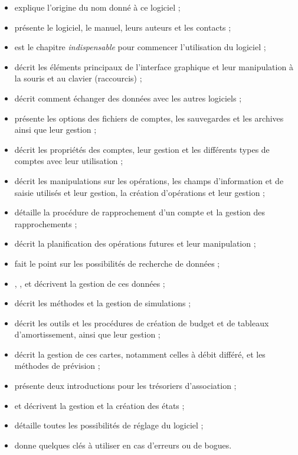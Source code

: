 \begin{itemize}
	\item {} explique l'origine du nom donné à ce logiciel ;
	\item {} présente le logiciel, le manuel, leurs auteurs et les contacts ;
	\item {} est le chapitre \emph{indispensable} pour commencer l'utilisation du logiciel ;
	\item {} décrit les éléments principaux de l'interface graphique et leur manipulation à la souris et au clavier (raccourcis) ;
	\item {} décrit comment échanger des données avec les autres logiciels ;
	\item {} présente les options des fichiers de comptes, les sauvegardes et les archives ainsi que leur gestion ;
	\item {} décrit les propriétés des comptes, leur gestion et les différents types de comptes avec leur utilisation ;
	\item {} décrit les manipulations sur les opérations, les champs d'information et de saisie utilisés et leur gestion, la création d'opérations et leur gestion ;
	\item {} détaille la procédure de rapprochement d'un compte et la gestion des rapprochements ;		
	\item {} décrit la planification des opérations futures et leur manipulation ;
	\item {} fait le point sur les possibilités de recherche de données ;
	\item {}, ,  et  décrivent la gestion de ces données ;
	\item {} décrit les méthodes et la gestion de simulations ;
	\item {} décrit les outils et les procédures de création de budget et de tableaux d'amortissement, ainsi que leur gestion ;
	\item {} décrit la gestion de ces cartes, notamment celles à débit différé, et les méthodes de prévision ;	
	\item {} présente deux introductions pour les trésoriers d'association ;
	\item {} et  décrivent la gestion et la création des états ;
	\item {} détaille toutes les possibilités de réglage du logiciel ;
	\item {} donne quelques clés à utiliser en cas d'erreurs ou de bogues.
\end{itemize}


